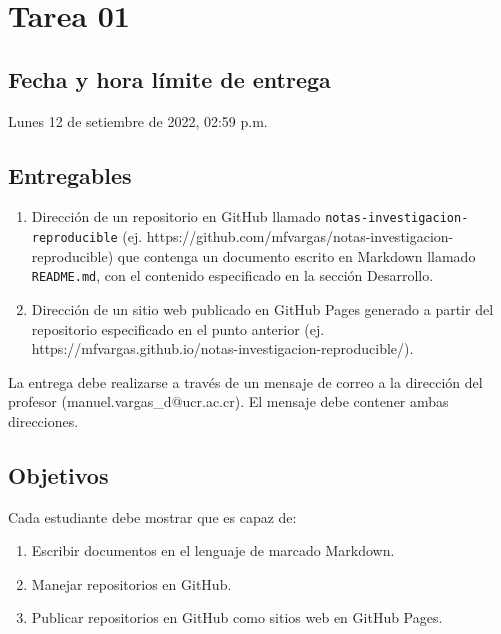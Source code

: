 \documentclass[
  letterpaper,
  DIV=11,
  numbers=noendperiod]{scrreprt}
\providecommand{\tightlist}{%
  \setlength{\itemsep}{0pt}\setlength{\parskip}{0pt}}\usepackage{longtable,booktabs,array}
\begin{document}
\hypertarget{tarea-01}{%
\chapter*{Tarea 01}\label{tarea-01}}

\hypertarget{fecha-y-hora-luxedmite-de-entrega}{%
\section*{Fecha y hora límite de
entrega}\label{fecha-y-hora-luxedmite-de-entrega}}

Lunes 12 de setiembre de 2022, 02:59 p.m.

\hypertarget{entregables}{%
\section*{Entregables}\label{entregables}}

\begin{enumerate}
\def\labelenumi{\arabic{enumi}.}
\tightlist
\item
  Dirección de un repositorio en GitHub llamado
  \texttt{notas-investigacion-reproducible} (ej.
  https://github.com/mfvargas/notas-investigacion-reproducible) que
  contenga un documento escrito en Markdown llamado \texttt{README.md},
  con el contenido especificado en la sección Desarrollo.
\item
  Dirección de un sitio web publicado en GitHub Pages generado a partir
  del repositorio especificado en el punto anterior (ej.
  https://mfvargas.github.io/notas-investigacion-reproducible/).
\end{enumerate}

La entrega debe realizarse a través de un mensaje de correo a la
dirección del profesor (manuel.vargas\_d@ucr.ac.cr). El mensaje debe
contener ambas direcciones.

\hypertarget{objetivos}{%
\section*{Objetivos}\label{objetivos}}

Cada estudiante debe mostrar que es capaz de:

\begin{enumerate}
\def\labelenumi{\arabic{enumi}.}
\tightlist
\item
  Escribir documentos en el lenguaje de marcado Markdown.
\item
  Manejar repositorios en GitHub.
\item
  Publicar repositorios en GitHub como sitios web en GitHub Pages.
\end{enumerate}
\end{document}
